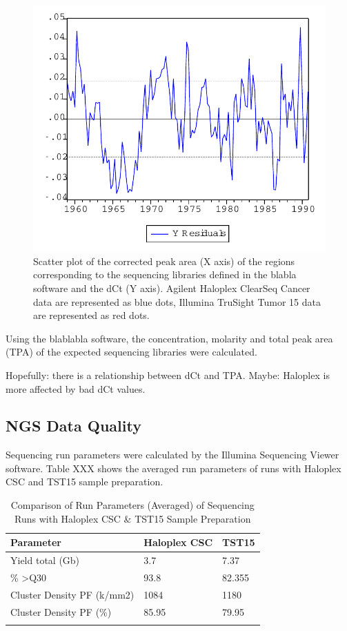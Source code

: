 \begin{figure}[!htbp]
  \begin{center}
    \includegraphics[scale=0.75,angle=0]{graph.pdf}
    \caption{Scatter plot of the corrected peak area (X axis) of the regions corresponding to the sequencing libraries defined in the blabla software and the dCt (Y axis). Agilent Haloplex ClearSeq Cancer data are represented as blue dots, Illumina TruSight Tumor 15 data are represented as red dots.}
    \label{Fig:bioanalyzer_scatter}
  \end{center}
\end{figure}

Using the blablabla software, the concentration, molarity and total peak area (TPA)
of the expected sequencing libraries were calculated.

Hopefully: there is a relationship between dCt and TPA. Maybe: Haloplex is more
affected by bad dCt values.

\subsection{NGS Data Quality}

Sequencing run parameters were calculated by the Illumina Sequencing Viewer software.
Table XXX shows the averaged run parameters of runs with Haloplex CSC and TST15
sample preparation.

\begin{table}[!htbp]
    \caption[ISV]{Comparison of Run Parameters (Averaged) of Sequencing Runs with Haloplex CSC \& TST15 Sample Preparation}
    \centering
    \begin{tabular}{ |p{4.5cm}|p{2cm}|p{2cm}|}
    \hline
    Parameter & Haloplex CSC & TST15 \\ \hline
    Yield total (Gb) & 3.7 & 7.37 \\
    \% \textgreater Q30 & 93.8 & 82.355 \\
    Cluster Density PF (k/mm2) & 1084 & 1180  \\
    Cluster Density PF (\%) & 85.95 & 79.95 \\
    \hline
    \label{sequencing_viewer}
  \end{tabular}
\end{table}

